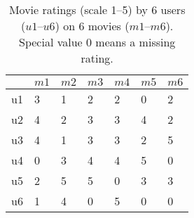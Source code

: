 \documentclass[a4paper,12pt]{article}
\begin{document}
\newpage
\begin{table}[!h]
\begin{center}
\caption{Movie ratings (scale 1--5) by 6 users ($u1$--$u6$) on 6 movies 
($m1$--$m6$). Special value 0 means a missing rating.}
\label{movier}
\begin{tabular}{|l|l|l|l|l|l|l|}
\hline
&$m1$&$m2$&$m3$&$m4$&$m5$&$m6$\\
\hline
u1&3&1&2&2&0&2\\
u2&4&2&3&3&4&2\\
u3&4&1&3&3&2&5\\
u4&0&3&4&4&5&0\\
u5&2&5&5&0&3&3\\
u6&1&4&0&5&0&0\\
\hline
\end{tabular}
\end{center}
\end{table}





% 
\end{document}
